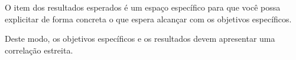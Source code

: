 O item dos resultados esperados é um espaço específico para que você possa explicitar de forma concreta o que espera alcançar com os objetivos específicos.

Deste modo, os objetivos específicos e os resultados devem apresentar uma correlação estreita.
